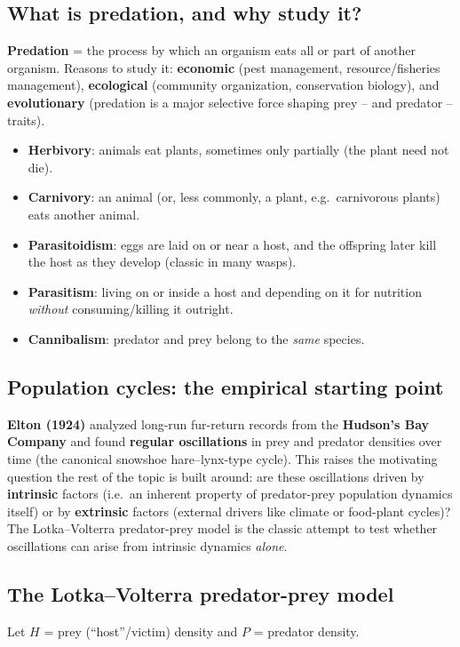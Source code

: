\documentclass[11pt,a4paper]{article}
\begin{document}
\subsection{What is predation, and why study it?}
\textbf{Predation} = the process by which an organism eats all or part of another organism. Reasons to study it: \textbf{economic} (pest management, resource/fisheries management), \textbf{ecological} (community organization, conservation biology), and \textbf{evolutionary} (predation is a major selective force shaping prey -- and predator -- traits).

\begin{keybox}[title=Five types of predation]
\begin{itemize}[leftmargin=*]
\item \textbf{Herbivory}: animals eat plants, sometimes only partially (the plant need not die).
\item \textbf{Carnivory}: an animal (or, less commonly, a plant, e.g.\ carnivorous plants) eats another animal.
\item \textbf{Parasitoidism}: eggs are laid on or near a host, and the offspring later kill the host as they develop (classic in many wasps).
\item \textbf{Parasitism}: living on or inside a host and depending on it for nutrition \emph{without} consuming/killing it outright.
\item \textbf{Cannibalism}: predator and prey belong to the \emph{same} species.
\end{itemize}
\end{keybox}

\subsection{Population cycles: the empirical starting point}
\textbf{Elton (1924)} analyzed long-run fur-return records from the \textbf{Hudson's Bay Company} and found \textbf{regular oscillations} in prey and predator densities over time (the canonical snowshoe hare--lynx-type cycle). This raises the motivating question the rest of the topic is built around: are these oscillations driven by \textbf{intrinsic} factors (i.e.\ an inherent property of predator-prey population dynamics itself) or by \textbf{extrinsic} factors (external drivers like climate or food-plant cycles)? The Lotka--Volterra predator-prey model is the classic attempt to test whether oscillations can arise from intrinsic dynamics \emph{alone}.

\subsection{The Lotka--Volterra predator-prey model}
Let $H$ = prey (``host''/victim) density and $P$ = predator density.
\end{document}
